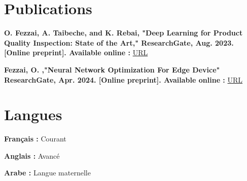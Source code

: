 \documentclass[letterpaper,10pt]{article}
\newenvironment{resume_list}{
  \vspace{-7pt}
  \begin{itemize}[itemsep=-2px, parsep=1pt, leftmargin=30pt]
}{
  \end{itemize}
}
\begin{document}

\section{Publications}
\begin{resume_list}
  \item \textbf{O. Fezzai, A. Taibeche, and K. Rebai, "Deep Learning for Product Quality Inspection: State of the Art," ResearchGate, Aug. 2023. [Online preprint]. Available online :} 
    \href{https://www.researchgate.net/publication/372862316_Deep_Learning_for_product_quality_inspection_State_of_the_art}{URL}
    
  \item \textbf{Fezzai, O. ,"Neural Network Optimization For Edge Device" ResearchGate, Apr. 2024. [Online preprint]. Available online :}
    \href{https://www.researchgate.net/publication/379807548_Neural_Network_Optimization_For_Edge_Device}{URL}
\end{resume_list}



\section{Langues}
\begin{resume_list}
  \item \textbf{Français :} Courant
  \item \textbf{Anglais :} Avancé
  \item \textbf{Arabe :} Langue maternelle
\end{resume_list}


\end{document}
